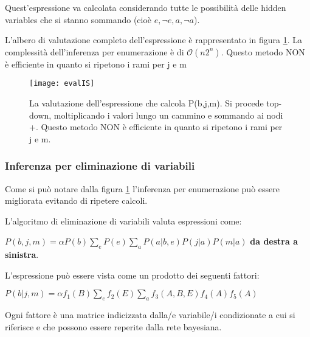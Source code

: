 Quest'espressione va calcolata considerando tutte le possibilità delle
hidden variables che si stanno sommando (cioè $e, \neg e, a, \neg a$).

L'albero di valutazione completo dell'espressione è rappresentato in figura
\ref{fig:evalIS}. La complessità dell'inferenza per enumerazione è di
$\mathcal{O}(n2^n)$. Questo metodo NON è efficiente in quanto si ripetono i
rami per j e m

\begin{figure}[H]
\centering
\texttt{[image: evalIS]}
\caption{La valutazione dell'espressione che calcola P(b,j,m). Si procede
top-down, moltiplicando i valori lungo un cammino e sommando ai nodi +.
Questo metodo NON è efficiente in quanto si ripetono i rami per j e m.}
\label{fig:evalIS}
\end{figure}

\subsubsection{Inferenza per eliminazione di variabili}

Come si può notare dalla figura \ref{fig:evalIS} l'inferenza per
enumerazione può essere migliorata evitando di ripetere calcoli.

L'algoritmo di eliminazione di variabili valuta espressioni come:

$P(b,j,m) = \alpha P(b) \sum_e P(e) \sum_a P(a|b,e)P(j|a)P(m|a)$
\textbf{da destra a sinistra}.

L'espressione può essere vista come un prodotto dei seguenti fattori:

$P(b|j,m) = \alpha f_1(B) \sum_e f_2(E) \sum_a f_3(A,B,E)f_4(A)f_5(A)$

Ogni fattore è una matrice indicizzata dalla/e variabile/i condizionate a
cui si riferisce e che possono essere reperite dalla rete bayesiana.


